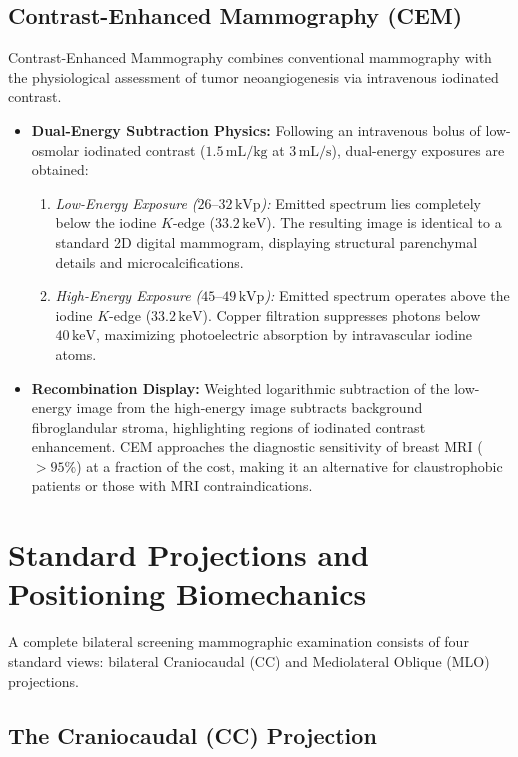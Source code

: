 \documentclass[11pt,a4paper]{article}
\begin{document}
\subsection{Contrast-Enhanced Mammography (CEM)}

Contrast-Enhanced Mammography combines conventional mammography with the physiological assessment of tumor neoangiogenesis via intravenous iodinated contrast.

\begin{itemize}[leftmargin=*]
    \item \textbf{Dual-Energy Subtraction Physics:} Following an intravenous bolus of low-osmolar iodinated contrast ($1.5\,\text{mL/kg}$ at $3\,\text{mL/s}$), dual-energy exposures are obtained:
    \begin{enumerate}
        \item \textit{Low-Energy Exposure ($26\text{--}32\,\text{kVp}$):} Emitted spectrum lies completely below the iodine $K$-edge ($33.2\,\text{keV}$). The resulting image is identical to a standard 2D digital mammogram, displaying structural parenchymal details and microcalcifications.
        \item \textit{High-Energy Exposure ($45\text{--}49\,\text{kVp}$):} Emitted spectrum operates above the iodine $K$-edge ($33.2\,\text{keV}$). Copper filtration suppresses photons below $40\,\text{keV}$, maximizing photoelectric absorption by intravascular iodine atoms.
    \end{enumerate}
    \item \textbf{Recombination Display:} Weighted logarithmic subtraction of the low-energy image from the high-energy image subtracts background fibroglandular stroma, highlighting regions of iodinated contrast enhancement. CEM approaches the diagnostic sensitivity of breast MRI ($> 95\%$) at a fraction of the cost, making it an alternative for claustrophobic patients or those with MRI contraindications.
\end{itemize}

\section{Standard Projections and Positioning Biomechanics}

A complete bilateral screening mammographic examination consists of four standard views: bilateral Craniocaudal (CC) and Mediolateral Oblique (MLO) projections.

\subsection{The Craniocaudal (CC) Projection}
\end{document}
